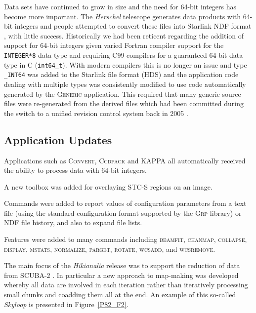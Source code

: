\documentclass[11pt,twoside]{article}
\begin{document}
Data sets have continued to grow in size and the need for 64-bit
integers has become more important. The \textit{Herschel} telescope
generates data products with 64-bit integers and people attempted to
convert these files into Starlink NDF format \citep[see][for an
overview of NDF]{P91_adassxxiii}, with little success. Historically we
had been reticent regarding the addition of support for 64-bit
integers given varied Fortran compiler support for the
\texttt{INTEGER*8} data type and requiring C99 compilers for a
guaranteed 64-bit data type in C (\texttt{int64\_t}). With modern
compilers this is no longer an issue and type \texttt{\_INT64} was
added to the Starlink file format (HDS) and the application code
dealing with multiple types was consistently modified to use code
automatically generated by the \textsc{Generic} application. This
required that many generic source files were re-generated from the
derived files which had been committed during the switch to a unified
revision control system back in 2005 \citep{2005ASPC..347..119G}.

\subsection*{Application Updates}

Applications such as \textsc{Convert}, \textsc{Ccdpack} and
\textsc{KAPPA} all automatically received the ability to process data
with 64-bit integers.


A new toolbox was added for overlaying STC-S regions on an image.



Commands were added to report values of configuration parameters from
a text file (using the standard configuration format supported by the
\textsc{Grp} library) or NDF file history, and also to expand file lists.

Features were added to many commands including \textsc{beamfit},
\textsc{chanmap}, \textsc{collapse}, \textsc{display}, \textsc{mstats},
\textsc{normalize}, \textsc{parget}, \textsc{rotate}, \textsc{wcsadd},
and \textsc{wcsremove}.


The main focus of the \textit{Hikianalia} release was to support the
reduction of data from SCUBA-2
\citep{2013MNRAS.430.2545C,2013MNRAS.430.2513H}. In particular a new
approach to map-making was developed whereby all data are involved in
each iteration rather than iteratively processing small chunks and
coadding them all at the end.  An example of this so-called
\textit{Skyloop} is presented in Figure~\ref{P82_F2}.
\end{document}

